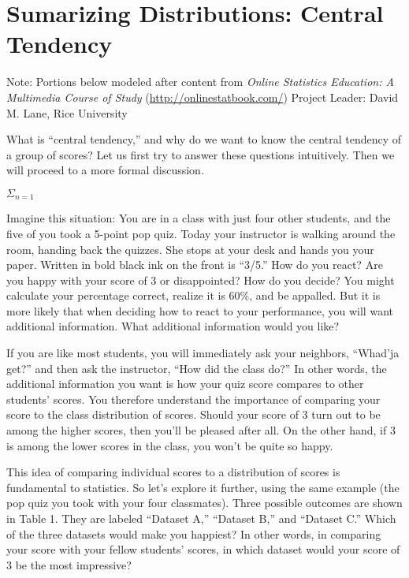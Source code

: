 \documentclass[
]{book}
\begin{document}
\hypertarget{sumarizing-distributions-central-tendency}{%
\chapter{Sumarizing Distributions: Central Tendency}\label{sumarizing-distributions-central-tendency}}

Note: Portions below modeled after content from
\emph{Online Statistics Education: A Multimedia Course of Study}
(\url{http://onlinestatbook.com/}) Project Leader: David M. Lane, Rice University

What is ``central tendency,'' and why do we want to know the central tendency of a group of scores? Let us first try to answer these questions intuitively. Then we will proceed to a more formal discussion.

\(\Sigma_{n=1}\)

Imagine this situation: You are in a class with just four other students, and the five of you took a 5-point pop quiz. Today your instructor is walking around the room, handing back the quizzes. She stops at your desk and hands you your paper. Written in bold black ink on the front is ``3/5.'' How do you react? Are you happy with your score of 3 or disappointed? How do you decide? You might calculate your percentage correct, realize it is 60\%, and be appalled. But it is more likely that when deciding how to react to your performance, you will want additional information. What additional information would you like?

If you are like most students, you will immediately ask your neighbors, ``Whad'ja get?'' and then ask the instructor, ``How did the class do?'' In other words, the additional information you want is how your quiz score compares to other students' scores. You therefore understand the importance of comparing your score to the class distribution of scores. Should your score of 3 turn out to be among the higher scores, then you'll be pleased after all. On the other hand, if 3 is among the lower scores in the class, you won't be quite so happy.

This idea of comparing individual scores to a distribution of scores is fundamental to statistics. So let's explore it further, using the same example (the pop quiz you took with your four classmates). Three possible outcomes are shown in Table 1. They are labeled ``Dataset A,'' ``Dataset B,'' and ``Dataset C.'' Which of the three datasets would make you happiest? In other words, in comparing your score with your fellow students' scores, in which dataset would your score of 3 be the most impressive?
\end{document}
